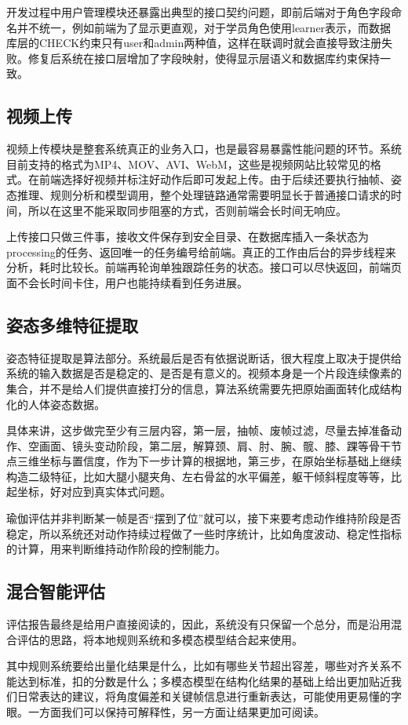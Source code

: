 开发过程中用户管理模块还暴露出典型的接口契约问题，即前后端对于角色字段命名并不统一，例如前端为了显示更直观，对于学员角色使用learner表示，而数据库层的CHECK约束只有user和admin两种值，这样在联调时就会直接导致注册失败。修复后系统在接口层增加了字段映射，使得显示层语义和数据库约束保持一致。

\subsection{视频上传}
视频上传模块是整套系统真正的业务入口，也是最容易暴露性能问题的环节。系统目前支持的格式为MP4、MOV、AVI、WebM，这些是视频网站比较常见的格式。在前端选择好视频并标注好动作后即可发起上传。由于后续还要执行抽帧、姿态推理、规则分析和模型调用，整个处理链路通常需要明显长于普通接口请求的时间，所以在这里不能采取同步阻塞的方式，否则前端会长时间无响应。

上传接口只做三件事，接收文件保存到安全目录、在数据库插入一条状态为processing的任务、返回唯一的任务编号给前端。真正的工作由后台的异步线程来分析，耗时比较长。前端再轮询单独跟踪任务的状态。接口可以尽快返回，前端页面不会长时间卡住，用户也能持续看到任务进展。

\subsection{姿态多维特征提取}
姿态特征提取是算法部分。系统最后是否有依据说断话，很大程度上取决于提供给系统的输入数据是否是稳定的、是否是有意义的。视频本身是一个片段连续像素的集合，并不是给人们提供直接打分的信息，算法系统需要先把原始画面转化成结构化的人体姿态数据。

具体来讲，这步做完至少有三层内容，第一层，抽帧、废帧过滤，尽量去掉准备动作、空画面、镜头变动阶段，第二层，解算颈、肩、肘、腕、髋、膝、踝等骨干节点三维坐标与置信度，作为下一步计算的根据地，第三步，在原始坐标基础上继续构造二级特征，比如大腿小腿夹角、左右骨盆的水平偏差，躯干倾斜程度等等，比起坐标，好对应到真实体式问题。

瑜伽评估并非判断某一帧是否“摆到了位”就可以，接下来要考虑动作维持阶段是否稳定，所以系统还对动作持续过程做了一些时序统计，比如角度波动、稳定性指标的计算，用来判断维持动作阶段的控制能力。

\subsection{混合智能评估}
评估报告最终是给用户直接阅读的，因此，系统没有只保留一个总分，而是沿用混合评估的思路，将本地规则系统和多模态模型结合起来使用。

其中规则系统要给出量化结果是什么，比如有哪些关节超出容差，哪些对齐关系不能达到标准，扣的分数是什么；多模态模型在结构化结果的基础上给出更加贴近我们日常表达的建议，将角度偏差和关键帧信息进行重新表达，可能使用更易懂的字眼。一方面我们可以保持可解释性，另一方面让结果更加可阅读。

